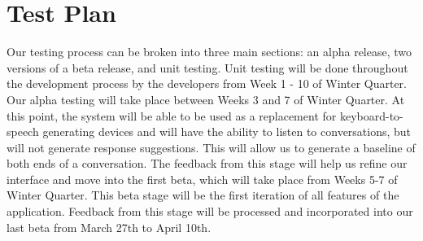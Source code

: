 \chapter{Test Plan}

Our testing process can be broken into three main sections: an alpha release, two versions of a beta release, and unit testing. Unit testing will be done throughout the development process by the developers from Week 1 - 10 of Winter Quarter. Our alpha testing will take place between Weeks 3 and 7 of Winter Quarter. At this point, the system will be able to be used as a replacement for keyboard-to-speech generating devices and will have the ability to listen to conversations, but will not generate response suggestions. This will allow us to generate a baseline of both ends of a conversation. The feedback from this stage will help us refine our interface and move into the first beta, which will take place from Weeks 5-7 of Winter Quarter. This beta stage will be the first iteration of all features of the application. Feedback from this stage will be processed and incorporated into our last beta from March 27th to April 10th.
